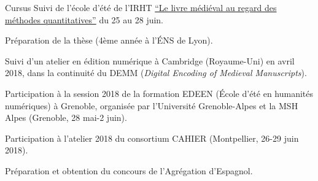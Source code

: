 \begin{rubric}{Cursus}
                                \entry*
                            Suivi de l'école d'été de l'IRHT \href{https://www.irht.cnrs.fr/?q=fr/agenda/le-livre-medieval-au-regard-des-methodes-quantitatives-0}{\enquote{Le livre médiéval au regard des méthodes quantitatives}}
                        du 25 au 28 juin.
                    
                                \entry*[2017-2018]
                            Préparation de la thèse (4ème année à l'ÉNS de Lyon). 
                    
                                \entry*
                            Suivi d'un atelier en édition numérique à Cambridge (Royaume-Uni) en avril
                        2018, dans la continuité du DEMM (\textit{Digital Encoding of Medieval
                            Manuscripts}).
                    
                                \entry*
                            Participation à la session 2018 de la formation EDEEN (École d'été en
                        humanités numériques) à Grenoble, organisée par l'Université Grenoble-Alpes et la
                        MSH Alpes (Grenoble, 28 mai-2 juin).
                    
                                \entry*
                            Participation à l'atelier 2018 du consortium CAHIER (Montpellier, 26-29
                        juin 2018).
                    
                                \entry*[2016-2017]
                            Préparation et obtention du concours de l'Agrégation d'Espagnol. 
                    

\end{rubric}
